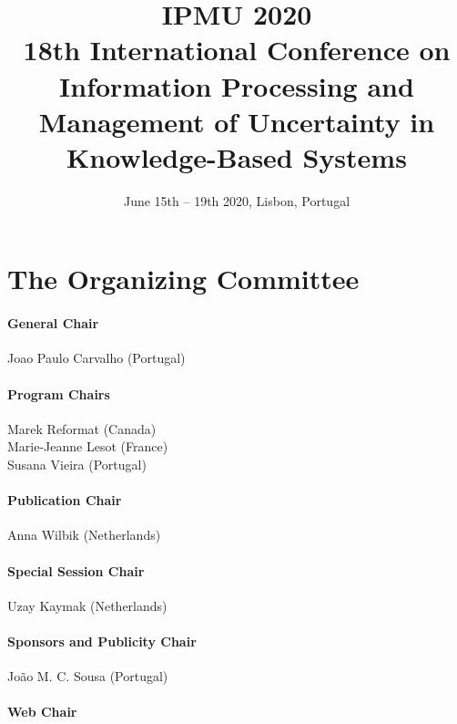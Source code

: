 \documentclass[11pt, twoside, b5paper]{extbook}
\title{IPMU 2020 \\
18th International Conference on Information Processing and Management of Uncertainty in Knowledge-Based Systems}
\author{June 15th – 19th 2020, Lisbon, Portugal}
\date{}
\begin{document}


\clearpage

\frontmatter
\maketitle

\begin{small}
\tableofcontents
\end{small}

\mainmatter

\chapter*{The Organizing Committee}

\subsubsection*{General Chair}

Joao Paulo Carvalho (Portugal)

\subsubsection*{Program Chairs}

Marek Reformat (Canada)\\
Marie-Jeanne Lesot (France)\\
Susana Vieira (Portugal)

\subsubsection*{Publication Chair}

Anna Wilbik (Netherlands)

\subsubsection*{Special Session Chair}

Uzay Kaymak (Netherlands)

\subsubsection*{Sponsors and Publicity Chair}

João M. C. Sousa (Portugal)

\subsubsection*{Web Chair}
\end{document}
